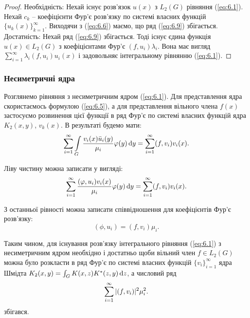\begin{proof}
	Необхідність: Нехай існує розв’язок $u(x)$ з $L_2(G)$ рівняння (\ref{eq:6.1}). Нехай $c_k$ -- коефіцієнти Фур’є розв’язку по системі власних функцій $\{u_k(x)\}_{k=1}^\infty$. Виходячи з (\ref{eq:6.6}) маємо, що ряд (\ref{eq:6.9}) збігається. \\

	Достатність: Нехай ряд (\ref{eq:6.9}) збігається. Тоді існує єдина функція $u(x) \in L_2(G)$ з коефіцієнтами Фур’є $(f,u_i)\lambda_i$. Вона має вигляд $\sum_{i=1}^\infty \lambda_i(f,u_i)u_i(x)$ і задовольняє інтегральному рівнянню (\ref{eq:6.1}).
\end{proof}

\subsubsection{Несиметричні ядра}

Розглянемо рівняння з несиметричним ядром (\ref{eq:6.1}). Для представлення ядра скористаємось формулою (\ref{eq:6.5}), а для представлення вільного члена $f(x)$ застосуємо розвинення цієї функції в ряд Фур’є по системі власних функцій ядра $K_2(x,y)$, $v_k(x)$. В результаті будемо мати:
\begin{equation}
	\label{eq:6.10}
	\displaystyle\sum\limits_{i=1}^\infty \displaystyle\int\limits_G \dfrac{v_i(x)\bar u_i(y)}{\mu_i} \varphi(y) \mathop{}\!\mathrm{d} y = \displaystyle\sum\limits_{i=1}^\infty (f,v_i)v_i(x).
\end{equation}

Ліву чистину можна записати у вигляді:
\begin{equation}
	\label{eq:6.11}
	\displaystyle\sum\limits_{i=1}^\infty \dfrac{(\varphi,u_i)v_i(x)}{\mu_i} \varphi(y) \mathop{}\!\mathrm{d} y = \displaystyle\sum\limits_{i=1}^\infty (f,v_i)v_i(x).
\end{equation}

З останньої рівності можна записати співвідношення для коефіцієнтів Фур’є розв’язку: 
\begin{equation}
	\label{eq:6.12}
	(\phi,u_i)=(f,v_i)\mu_i.
\end{equation}

Таким чином, для існування розв’язку інтегрального рівняння (\ref{eq:6.1}) з несиметричним ядром необхідно і достатньо щоби вільний член $f\in L_2(G)$ можна було розкласти в ряд Фур’є по системі власних функцій $\{v_i\}_{i=1}^\infty$ ядра Шмідта $K_2(x,y)=\int_G K(x,z)K^*(z,y)\mathop{}\!\mathrm{d} z$, а числовий ряд
\begin{equation}
	\label{eq:6.13}
	\displaystyle\sum\limits_{i=1}^\infty |(f,v_i)|^2 \mu_i^2.
\end{equation}
збігався.

